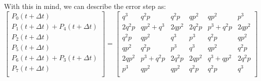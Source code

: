 \documentclass{report}
\begin{document}
\begin{appendices}
With this in mind, we can describe the error step as:
\begin{equation} \label{eq:Ematrix}
    \begin{bmatrix}
        P_0(t+\Delta t) \\
        P_1(t+\Delta t) + P_4(t+\Delta t) \\
        P_2(t+\Delta t) \\
        P_5(t+\Delta t) \\
        P_6(t+\Delta t)  + P_3(t + \Delta t)\\
        P_7(t+\Delta t) \\
    \end{bmatrix}
    =
    \begin{bmatrix}
        q^3& q^2p& q^2p& qp^2& qp^2& p^3 \\
        2 q^2p& qp^2 + q^3& 2 qp^2& 2 q^2p& p^3 + q^2p& 2 qp^2\\
        q^2p& qp^2& q^3& p^3& q^2p& qp^2\\
        qp^2& q^2p& p^3& q^3& qp^2& q^2p\\
        2 qp^2& p^3 + q^2p& 2 q^2p& 2 qp^2& q^3 + qp^2& 2 q^2p\\
        p^3& qp^2& qp^2& q^2p& q^2p& q^3\\


\end{bmatrix}
\end{equation}
\end{appendices}
\end{document}

